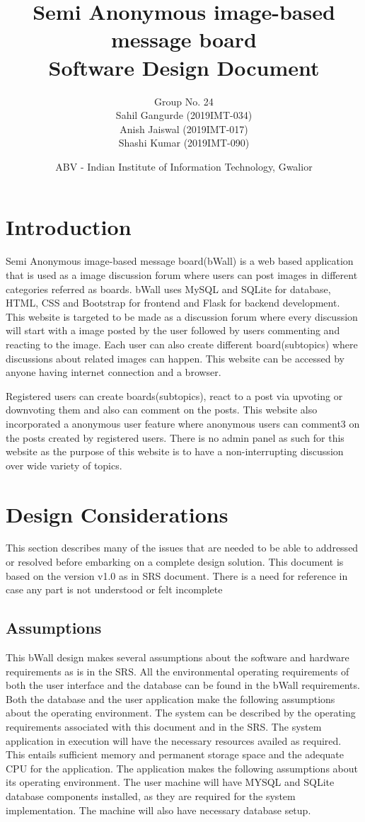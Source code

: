 \documentclass[12pt]{report}
\title{Semi Anonymous image-based message board \\ 
        \large Software Design Document}
\author{Group No. 24\\Sahil Gangurde (2019IMT-034)\\Anish Jaiswal (2019IMT-017)\\Shashi Kumar (2019IMT-090)}
\date{ABV - Indian Institute of Information Technology, Gwalior}
\begin{document}
\maketitle

\newpage
\tableofcontents
\newpage

\chapter{Introduction}
Semi Anonymous image-based message board(bWall) is a web based application that is used as a image discussion forum where users can post images in different categories referred as boards. bWall uses MySQL and SQLite for database, HTML, CSS and Bootstrap for frontend and Flask for backend development. This website is targeted to be made as a discussion forum where every discussion will start with a image posted by the user followed by users commenting and  reacting  to  the  image.   Each  user  can  also  create  different  board(subtopics)  where  discussions  about  related  images  can  happen.   This  website can be accessed by anyone having internet connection and a browser.

Registered users can create boards(subtopics), react to a post via upvoting or downvoting them and also can comment on the posts.  This website also incorporated a anonymous user feature where anonymous users can comment3
 on the posts created by registered users.  There is no admin panel as such for this website as the purpose of this website is to have a non-interrupting discussion over wide variety of topics.

\chapter{Design Considerations}
This section describes many of the issues that are needed to be able to addressed or resolved before embarking on a complete design solution. This document is based on the version v1.0 as in SRS document. There is a need for reference in case any part is not understood or felt incomplete

\section{Assumptions}
This bWall design makes several assumptions about the software and hardware requirements as is in the SRS. All the environmental operating requirements of both the user interface and the database can be found in the bWall requirements. Both the database and the user application make the following assumptions about the operating environment. The system can be described by the operating requirements associated with this document and in the SRS. The system application in execution will have the necessary resources availed as required. This entails sufficient memory and permanent storage space and the adequate CPU for the application. The application makes the following assumptions about its operating environment. The user machine will have MYSQL and SQLite database components installed, as they are required for the system implementation. The machine will also have necessary database setup.
\end{document}
